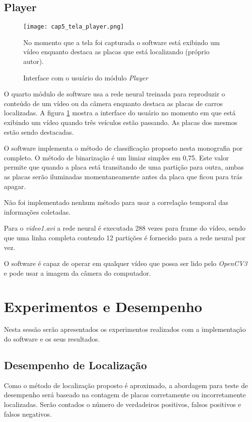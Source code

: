 \subsection{Player}

\begin{figure}[!htb]
	\centering
	\texttt{[image: cap5\_tela\_player.png]}
	\caption{Interface com o usuário do módulo \emph{Player}}
	\label{fig:cap5_tela_player}
	No momento que a tela foi capturada o software está exibindo um vídeo
	enquanto destaca as placas que está localizando (próprio autor).
\end{figure}

O quarto módulo de software usa a rede neural treinada para reproduzir o
conteúdo de um vídeo ou da câmera enquanto destaca as placas de carros
localizadas. A figura \ref{fig:cap5_tela_player} mostra a interface do usuário
no momento em que está exibindo um vídeo quando três veículos estão passando.
As placas dos mesmos estão sendo destacadas.

O software implementa o método de classificação proposto nesta monografia por
completo. O método de binarização é um limiar simples em 0,75. Este valor
permite que quando a placa está transitando de uma partição para outra, ambas
as placas serão iluminadas momentaneamente antes da placa que ficou para trás
apagar.

Não foi implementado nenhum método para usar a correlação temporal das
informações coletadas.

Para o \emph{video1.avi} a rede neural é executada 288 vezes para frame do
vídeo, sendo que uma linha completa contendo 12 partições é fornecido para a
rede neural por vez.

O software é capaz de operar em qualquer vídeo que possa ser lido pelo
\emph{OpenCV3} e pode usar a imagem da câmera do computador.

\section{Experimentos e Desempenho}

Nesta sessão serão apresentados os experimentos realizados com a implementação
do software e os seus resultados.

\subsection{Desempenho de Localização}

Como o método de localização proposto é aproximado, a abordagem para teste de
desempenho será baseado na contagem de placas corretamente ou
incorretamente localizadas. Serão contados o número de
verdadeiros positivos, falsos positivos e falsos negativos.

